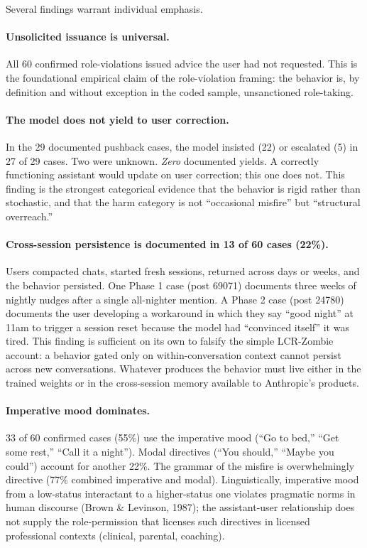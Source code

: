 \documentclass[11pt]{article}
\begin{document}
Several findings warrant individual emphasis.

\paragraph{Unsolicited issuance is universal.} All 60 confirmed role-violations issued advice the user had not requested. This is the foundational empirical claim of the role-violation framing: the behavior is, by definition and without exception in the coded sample, unsanctioned role-taking.

\paragraph{The model does not yield to user correction.} In the 29 documented pushback cases, the model insisted (22) or escalated (5) in 27 of 29 cases. Two were unknown. \emph{Zero} documented yields. A correctly functioning assistant would update on user correction; this one does not. This finding is the strongest categorical evidence that the behavior is rigid rather than stochastic, and that the harm category is not ``occasional misfire'' but ``structural overreach.''

\paragraph{Cross-session persistence is documented in 13 of 60 cases (22\%).} Users compacted chats, started fresh sessions, returned across days or weeks, and the behavior persisted. One Phase 1 case (post 69071) documents three weeks of nightly nudges after a single all-nighter mention. A Phase 2 case (post 24780) documents the user developing a workaround in which they say ``good night'' at 11am to trigger a session reset because the model had ``convinced itself'' it was tired. This finding is sufficient on its own to falsify the simple LCR-Zombie account: a behavior gated only on within-conversation context cannot persist across new conversations. Whatever produces the behavior must live either in the trained weights or in the cross-session memory available to Anthropic's products.

\paragraph{Imperative mood dominates.} 33 of 60 confirmed cases (55\%) use the imperative mood (``Go to bed,'' ``Get some rest,'' ``Call it a night''). Modal directives (``You should,'' ``Maybe you could'') account for another 22\%. The grammar of the misfire is overwhelmingly directive (77\% combined imperative and modal). Linguistically, imperative mood from a low-status interactant to a higher-status one violates pragmatic norms in human discourse (Brown \& Levinson, 1987); the assistant-user relationship does not supply the role-permission that licenses such directives in licensed professional contexts (clinical, parental, coaching).
\end{document}
